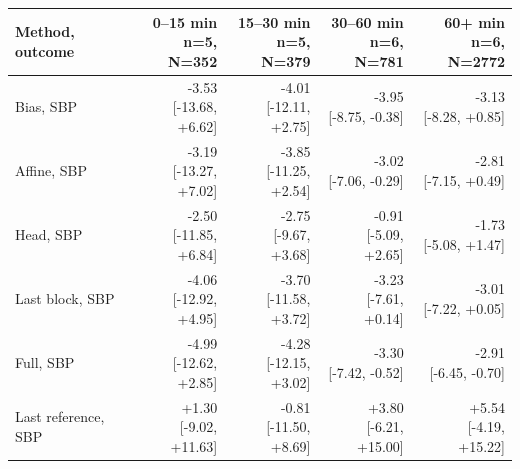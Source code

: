 \documentclass[11pt]{article}
\begin{document}
\begin{table}[t]\centering\scriptsize\renewcommand{\arraystretch}{1.15}
\begin{tabular}{lrrrr}\toprule
Method, outcome & \shortstack{0--15 min\\n=5, N=352} & \shortstack{15--30 min\\n=5, N=379} & \shortstack{30--60 min\\n=6, N=781} & \shortstack{60+ min\\n=6, N=2772}\\\midrule
Bias, SBP & \shortstack{-3.53\\{[-13.68, +6.62]}} & \shortstack{-4.01\\{[-12.11, +2.75]}} & \shortstack{-3.95\\{[-8.75, -0.38]}} & \shortstack{-3.13\\{[-8.28, +0.85]}}\\
Affine, SBP & \shortstack{-3.19\\{[-13.27, +7.02]}} & \shortstack{-3.85\\{[-11.25, +2.54]}} & \shortstack{-3.02\\{[-7.06, -0.29]}} & \shortstack{-2.81\\{[-7.15, +0.49]}}\\
Head, SBP & \shortstack{-2.50\\{[-11.85, +6.84]}} & \shortstack{-2.75\\{[-9.67, +3.68]}} & \shortstack{-0.91\\{[-5.09, +2.65]}} & \shortstack{-1.73\\{[-5.08, +1.47]}}\\
Last block, SBP & \shortstack{-4.06\\{[-12.92, +4.95]}} & \shortstack{-3.70\\{[-11.58, +3.72]}} & \shortstack{-3.23\\{[-7.61, +0.14]}} & \shortstack{-3.01\\{[-7.22, +0.05]}}\\
Full, SBP & \shortstack{-4.99\\{[-12.62, +2.85]}} & \shortstack{-4.28\\{[-12.15, +3.02]}} & \shortstack{-3.30\\{[-7.42, -0.52]}} & \shortstack{-2.91\\{[-6.45, -0.70]}}\\
Last reference, SBP & \shortstack{+1.30\\{[-9.02, +11.63]}} & \shortstack{-0.81\\{[-11.50, +8.69]}} & \shortstack{+3.80\\{[-6.21, +15.00]}} & \shortstack{+5.54\\{[-4.19, +15.22]}}\\

\end{tabular}
\end{table}
\end{document}

